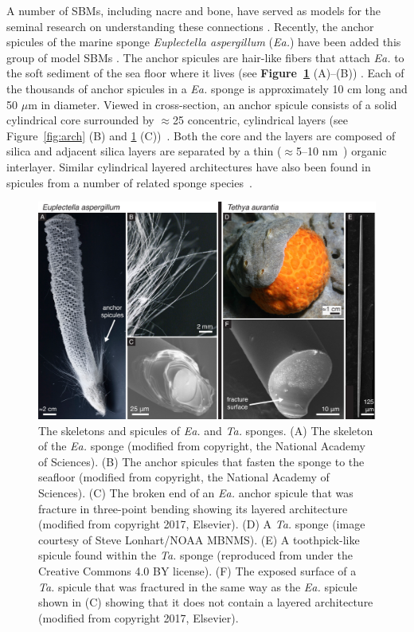 \documentclass[12pt,onecolumn]{article}
\makeatletter
\newcommand{\TA}{\textit{Ta.\@}\xspace}
\newcommand{\EA}{\textit{Ea.\@}\xspace}
\makeatother
\begin{document}
\begin{bibunit}
A number of SBMs, including nacre and bone, have served as models for the seminal research on understanding these connections \cite{jackson1988,currey1977}. Recently, the anchor spicules of the marine sponge \textit{Euplectella aspergillum} (\EA) have been added this group of model SBMs \cite{mayer2005rigid,mayer2011new,kolednik2011bioinspired,walter2007mechanisms}. The anchor spicules are hair-like fibers that attach \EA to the soft sediment of the sea floor where it lives (see {\bf Figure~\ref{fig:EATA}} (A)--(B)) \cite{weaver2007hierarchical}. Each of the thousands of anchor spicules in a \EA sponge is approximately 10 cm long and 50 $\mu$m in diameter. Viewed in cross-section, an anchor spicule consists of a solid cylindrical core surrounded by $\approx$25 concentric, cylindrical layers (see Figure~\ref{fig:arch} (B) and \ref{fig:EATA} (C))~\cite{aizenberg2005skeleton,weaver2007hierarchical,monn2015new}. Both the core and the layers are composed of silica and adjacent silica layers are separated by a thin ($\approx$5--10 nm~\cite{weaver2007hierarchical}) organic interlayer.
Similar cylindrical layered architectures have also been found in spicules from a number of related sponge species~\cite{sarikaya2001biomimetic,weaver2010unifying,levi1989remarkably,wang2010silica}.
%
			\begin{figure}[ht!]
			\centering
			\includegraphics[width=\textwidth]{../Figures/FigureEATA/Figure2_V2.pdf}
			\caption{The skeletons and spicules of \EA and \TA sponges. (A) The skeleton of the \EA sponge (modified from \cite{monn2015new} copyright, the National Academy of Sciences). (B) The anchor spicules that fasten the sponge to the seafloor (modified from \cite{monn2015new} copyright, the National Academy of Sciences). (C) The broken end of an \EA anchor spicule that was fracture in three-point bending showing its layered architecture (modified from \cite{monn2017enhanced} copyright 2017, Elsevier). (D) A \TA sponge (image courtesy of Steve Lonhart/NOAA MBNMS). (E) A toothpick-like spicule found within the \TA sponge (reproduced from \cite{monn2017new} under the Creative Commons 4.0 BY license). (F) The exposed surface of a \TA spicule that was fractured in the same way as the \EA spicule shown in (C) showing that it does not contain a layered architecture (modified from \cite{monn2017enhanced} copyright 2017, Elsevier).}
			\label{fig:EATA}
			\end{figure}


\end{bibunit}
\end{document}
